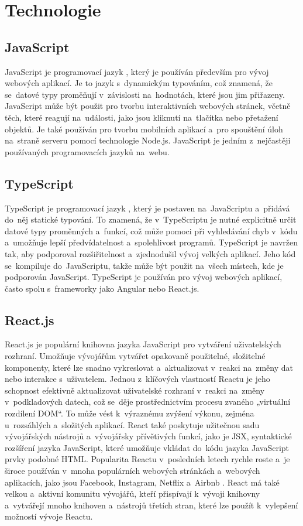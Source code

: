 \section{Technologie}

\subsection{JavaScript}
JavaScript je programovací jazyk \cite{javascript}, který je používán především pro vývoj webových aplikací. Je to jazyk s~dynamickým typováním, což znamená, že se~datové typy proměňují v~závislosti na~hodnotách, které jsou jim přiřazeny. JavaScript může být použit pro tvorbu interaktivních webových stránek, včetně těch, které reagují na~události, jako jsou kliknutí na~tlačítka nebo přetažení objektů. Je také používán pro tvorbu mobilních aplikací a~pro spouštění úloh na~straně serveru pomocí technologie Node.js. JavaScript je jedním z~nejčastěji používaných programovacích jazyků na~webu.

\subsection{TypeScript} TypeScript je programovací jazyk \cite{typescript}, který je postaven na~JavaScriptu a~přidává do~něj statické typování. To znamená, že v~TypeScriptu je nutné explicitně určit datové typy proměnných a~funkcí, což může pomoci při vyhledávání chyb v~kódu a~umožňuje lepší předvídatelnost a~spolehlivost programů. TypeScript je navržen tak, aby podporoval rozšiřitelnost a~zjednodušil vývoj velkých aplikací. Jeho kód se~kompiluje do~JavaScriptu, takže může být použit na~všech místech, kde je podporován JavaScript. TypeScript je používán pro vývoj webových aplikací, často spolu s~frameworky jako Angular nebo React.js.
\subsection{React.js}\label{reactjs} React.js je populární knihovna jazyka JavaScript pro vytváření uživatelských rozhraní. Umožňuje vývojářům vytvářet opakovaně použitelné, složitelné komponenty, které lze snadno vykreslovat a~aktualizovat v~reakci na~změny dat nebo interakce s~uživatelem. Jednou z~klíčových vlastností Reactu je jeho schopnost efektivně aktualizovat uživatelské rozhraní v~reakci na~změny v~podkladových datech, což se~děje prostřednictvím procesu zvaného „virtuální rozdílení DOM“. To může vést k~výraznému zvýšení výkonu, zejména u~rozsáhlých a~složitých aplikací. React také poskytuje užitečnou sadu vývojářských nástrojů a~vývojářsky přívětivých funkcí, jako je JSX, syntaktické rozšíření jazyka JavaScript, které umožňuje vkládat do~kódu jazyka JavaScript prvky podobné HTML. Popularita Reactu v~posledních letech rychle roste a~je široce používán v~mnoha populárních webových stránkách a~webových aplikacích, jako jsou Facebook, Instagram, Netflix a~Airbnb \cite{reactUsers}. React má také velkou a~aktivní komunitu vývojářů, kteří přispívají k~vývoji knihovny a~vytvářejí mnoho knihoven a~nástrojů třetích stran, které lze použít k~vylepšení možností vývoje Reactu.
